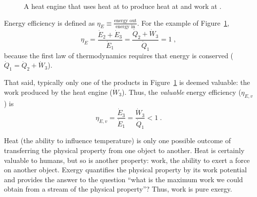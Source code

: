 \documentclass[energies,article,accept,moreauthors,pdftex]{Definitions/mdpi}\usepackage[]{graphicx}\usepackage[]{color}
\newcommand{\rev}[2]{#2}
\providecommand{\DIFdelbegin}{} %
\newcommand{\DIFscaledelfig}{0.5}
\newlength{\DIFdelgraphicswidth} %
\newlength{\DIFdelgraphicsheight} %
\newcommand{\DIFdelincludegraphics}[2][]{%
\sbox{\DIFdelgraphicsbox}{\DIFOincludegraphics[#1]{#2}}%
\settoboxwidth{\DIFdelgraphicswidth}{\DIFdelgraphicsbox} %
\settoboxtotalheight{\DIFdelgraphicsheight}{\DIFdelgraphicsbox} %
\scalebox{\DIFscaledelfig}{%
\parbox[b]{\DIFdelgraphicswidth}{\usebox{\DIFdelgraphicsbox}\\[-\baselineskip] \rule{\DIFdelgraphicswidth}{0em}}\llap{\resizebox{\DIFdelgraphicswidth}{\DIFdelgraphicsheight}{%
\setlength{\unitlength}{\DIFdelgraphicswidth}%
\begin{picture}(1,1)%
\thicklines\linethickness{2pt} %
{\color[rgb]{1,0,0}\put(0,0){\framebox(1,1){}}}%
{\color[rgb]{1,0,0}\put(0,0){\line( 1,1){1}}}%
{\color[rgb]{1,0,0}\put(0,1){\line(1,-1){1}}}%
\end{picture}%
}\hspace*{3pt}}} %
} %
\DeclareRobustCommand{\DIFdelbegin}{\DIFOdelbegin \let\includegraphics\DIFdelincludegraphics} %
\begin{document}
\begin{figure}[H]
\centering
{}
\caption{A heat engine that uses heat at  to produce heat at  and work at .}
\label{fig:heat_engine}
\end{figure}

Energy efficiency is defined as $\eta_E \equiv \frac{\text{energy out}}{\text{energy in}}$.
For the example of Figure~\ref{fig:heat_engine}, 
\begin{equation} \label{eq:energy_efficiency}
  \eta_E = \frac{\dot{E}_2 + \dot{E}_3}{\dot{E}_1} = \frac{\dot{Q}_2 + \dot{W}_3}{\dot{Q}_1} = 1 \; ,
\end{equation}
%
because the first law of thermodynamics requires
that energy is conserved ($\dot{Q}_1 = \dot{Q}_2 + \dot{W}_3$).

That said, typically only one of the products in Figure~\ref{fig:heat_engine} 
is deemed valuable: the work produced by the heat engine ($\dot{W}_3$).
Thus, the \emph{valuable} energy efficiency ($\eta_{E,v}$) is 
\begin{equation} \label{eq:valuable_energy_efficiency}
  \eta_{E,v} = \frac{\dot{E}_3}{\dot{E}_1} = \frac{\dot{W}_3}{\dot{Q}_1} < 1 \; .
\end{equation}

Heat (the ability to influence temperature) is 
only one possible outcome of transferring the physical property
from one object to another.
Heat is certainly valuable to humans, but so is another property: 
work, the ability to exert a force on another object.
Exergy quantifies the physical property by its work potential
and provides the answer to the question
``what is the maximum work we could obtain from a stream of \DIFdelbegin %
the  physical property''?
Thus, work is pure exergy.
\end{document}
